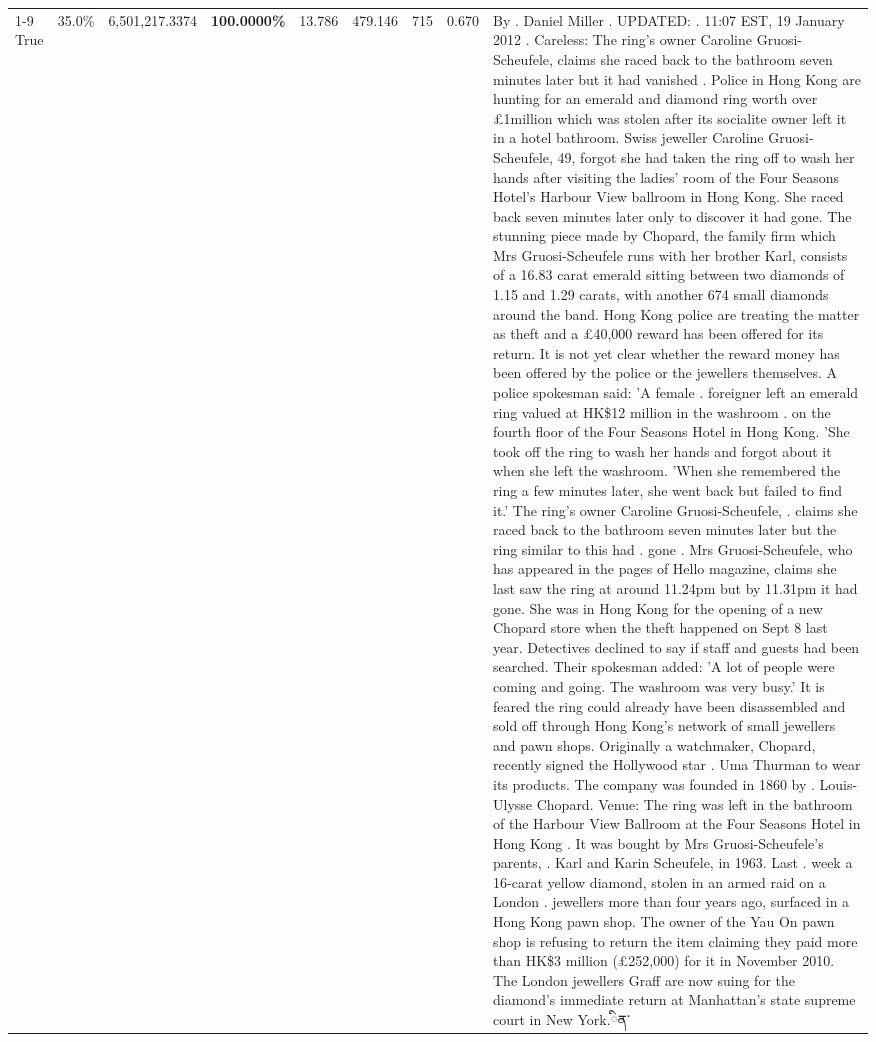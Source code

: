 \begin{table}[H]
\begin{tabular}{lllrlllll}
\cline{1-9}
True & 35.0\% & 6,501,217.3374 & \bfseries \color{red} 100.0000\% & 13.786 & 479.146 & 715 & 0.670 & By . Daniel Miller . UPDATED: . 11:07 EST, 19 January 2012 . Careless: The ring's owner Caroline Gruosi-Scheufele, claims she raced back to the bathroom seven minutes later but it had vanished . Police in Hong Kong are hunting for an emerald and diamond ring worth over £1million which was stolen after its socialite owner left it in a hotel bathroom. Swiss jeweller Caroline Gruosi-Scheufele, 49, forgot she had taken the ring off to wash her hands after visiting the ladies' room of the Four Seasons Hotel's Harbour View ballroom in Hong Kong. She raced back seven minutes later only to discover it had gone. The stunning piece made by Chopard, the family firm which Mrs Gruosi-Scheufele runs with her brother Karl, consists of a 16.83 carat emerald sitting between two diamonds of 1.15 and 1.29 carats, with another 674 small diamonds around the band. Hong Kong police are treating the matter as theft and a £40,000 reward has been offered for its return. It is not yet clear whether the reward money has been offered by the police or the jewellers themselves. A police spokesman said: 'A female . foreigner left an emerald ring valued at HK\$12 million in the washroom . on the fourth floor of the Four Seasons Hotel in Hong Kong. 'She took off the ring to wash her hands and forgot about it when she left the washroom. 'When she remembered the ring a few minutes later, she went back but failed to find it.' The ring's owner Caroline Gruosi-Scheufele, . claims she raced back to the bathroom seven minutes later but the ring similar to this had . gone . Mrs Gruosi-Scheufele, who has appeared in the pages of Hello magazine, claims she last saw the ring at around 11.24pm but by 11.31pm it had gone. She was in Hong Kong for the opening of a new Chopard store when the theft happened on Sept 8 last year. Detectives declined to say if staff and guests had been searched. Their spokesman added: 'A lot of people were coming and going. The washroom was very busy.' It is feared the ring could already have been disassembled and sold off through Hong Kong's network of small jewellers and pawn shops. Originally a watchmaker, Chopard, recently signed the Hollywood star . Uma Thurman to wear its products. The company was founded in 1860 by . Louis-Ulysse Chopard. Venue: The ring was left in the bathroom of the Harbour View Ballroom at the Four Seasons Hotel in Hong Kong . It was bought by Mrs Gruosi-Scheufele's  parents, . Karl and Karin Scheufele, in 1963. Last . week a 16-carat yellow diamond, stolen in an armed raid on a London . jewellers more than four years ago, surfaced in a Hong Kong pawn shop. The owner of the Yau On pawn shop is refusing to return the item claiming they paid more than HK\$3 million (£252,000) for it in November 2010. The London jewellers Graff are now suing for the diamond’s immediate return at Manhattan’s state supreme court in New York.ིན་ \\

\end{tabular}
\end{table}
